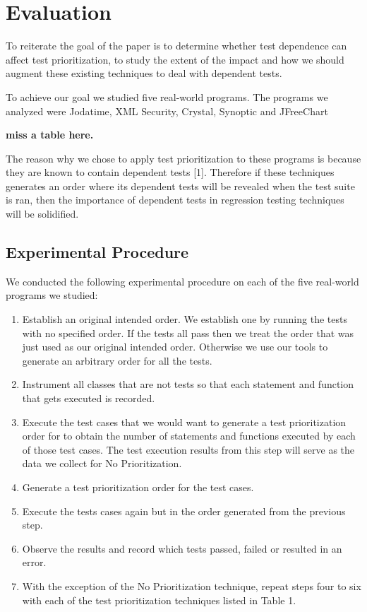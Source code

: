 \section{Evaluation}

To reiterate the goal of the paper is to determine whether test dependence can affect test prioritization, to study the extent of the impact and how we should augment these existing techniques to deal with dependent tests.

To achieve our goal we studied five real-world programs. The programs we analyzed were Jodatime, XML Security, Crystal, Synoptic and JFreeChart 

\textbf{miss a table here.}

The reason why we chose to apply test prioritization to these programs is because they are known to contain dependent tests [1]. Therefore if these techniques generates an order where its dependent tests will be revealed when the test suite is ran, then the importance of dependent tests in regression testing techniques will be solidified.

\subsection{Experimental Procedure}

We conducted the following experimental procedure on each of the five real-world programs we studied:

\begin{enumerate}
\item Establish an original intended order. We establish one by running the tests with no specified order. If the tests all pass then we treat the order that was just used as our original intended order. Otherwise we use our tools to generate an arbitrary order for all the tests. 
\item Instrument all classes that are not tests so that each statement and function that gets executed is recorded.
\item Execute the test cases that we would want to generate a test prioritization order for to obtain the number of statements and functions executed by each of those test cases. The test execution results from this step will serve as the data we collect for No Prioritization. 
\item Generate a test prioritization order for the test cases. 
\item Execute the tests cases again but in the order generated from the previous step.
\item Observe the results and record which tests passed, failed or resulted in an error.
\item With the exception of the No Prioritization technique, repeat steps four to six with each of the test prioritization techniques listed in Table 1.
\end{enumerate}


